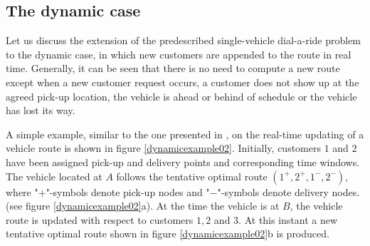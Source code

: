 \documentclass[dissertation,draft*]{aaltoseries}
\begin{document}
\subsection{The dynamic case}
\label{dynamicdarp}
Let us discuss the extension of the predescribed single-vehicle dial-a-ride problem to 
the dynamic case, in which new customers are appended to the route in real time.
Generally, it can be seen that there is no need to compute a new route
except when a new customer request occurs, a customer does not show up at the agreed pick-up location,
the vehicle is ahead or behind of schedule or the vehicle has lost its way. 

A simple example, similar to the one presented in \cite{psaraftis01},
on the real-time updating of a vehicle route %
is shown in figure \ref{dynamicexample02}.
Initially, customers $1$ and $2$ have been assigned 
pick-up and delivery points and corresponding time windows. The vehicle located at $A$ follows the
tentative optimal route $(1^{+},2^{+},1^{-},2^{-})$,
where "$+$"-symbols denote pick-up nodes and "$-$"-symbols denote delivery nodes. 
(see figure \ref{dynamicexample02}a).
At the time the vehicle is at $B$, the vehicle route is updated with respect 
to customers $1,2$ and $3$. At this instant %
a new tentative optimal route shown in figure \ref{dynamicexample02}b is produced. 
\end{document}
